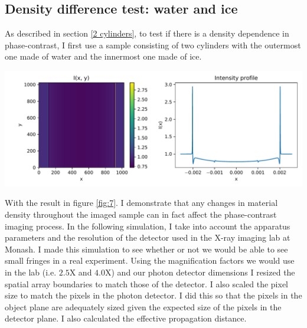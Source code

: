 \documentclass[10pt, a4paper, singlespacing]{report}
\newenvironment{Figure}
    {\par\medskip\noindent\minipage{\linewidth}}
    {\endminipage\par\medskip}
\begin{document}
\subsection{Density difference test: water and ice}
As described in section \ref{2 cylinders}, to test if there is a density dependence in phase-contrast, I first use a sample consisting of two cylinders with the outermost one made of water and the innermost one made of ice.
\begin{Figure}
\centering
\includegraphics[width=\linewidth]{ice_water_AS.pdf}
\label{fig:7}
\end{Figure}
With the result in figure \ref{fig:7}. I demonstrate that any changes in material density throughout the imaged sample can in fact affect the phase-contrast imaging process.
In the following simulation, I take into account the apparatus parameters and the resolution of the detector used in the X-ray imaging lab at Monash. I made this simulation to see whether or not we would be able to see small fringes in a real experiment. Using the magnification factors we would use in the lab (i.e. $2.5$X and $4.0$X) and our photon detector dimensions I resized the spatial array boundaries to match those of the detector. I also scaled the pixel size to match the pixels in the photon detector. I did this so that the pixels in the object plane are adequately sized given the expected size of the pixels in the detector plane. I also calculated the effective propagation distance.
\end{document}

